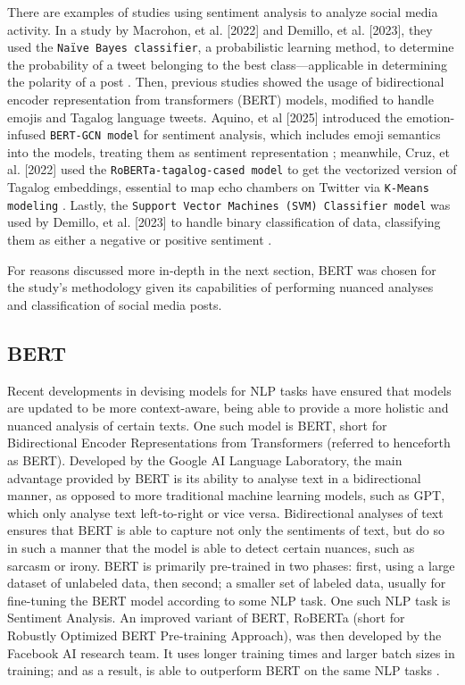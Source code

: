 There are examples of studies using sentiment analysis to analyze social media activity. In a study by Macrohon, et al. [2022] and Demillo, et al. [2023], they used the \texttt{Naïve Bayes classifier}, a probabilistic learning method, to determine the probability of a tweet belonging to the best class—applicable in determining the polarity of a post \cite{RRL_Macrohon-2022,RRL_Demillo-2025}. Then, previous studies showed the usage of bidirectional encoder representation from transformers (BERT) models, modified to handle emojis and Tagalog language tweets. Aquino, et al [2025] introduced the emotion-infused \texttt{BERT-GCN model} for sentiment analysis, which includes emoji semantics into the models, treating them as sentiment representation  \cite{RRL_Aquino-2025}; meanwhile, Cruz, et al. [2022] used the \texttt{RoBERTa-tagalog-cased model} to get the vectorized version of Tagalog embeddings, essential to map echo chambers on Twitter via \texttt{K-Means modeling} \cite{RRL_Cruz-2022}. Lastly, the \texttt{Support Vector Machines (SVM) Classifier model} was used by Demillo, et al. [2023] to handle binary classification of data, classifying them as either a negative or positive sentiment \cite{RRL_Demillo-2025}.

For reasons discussed more in-depth in the next section, BERT was chosen for the study’s methodology given its capabilities of performing nuanced analyses and classification of social media posts.

\subsection{BERT}
Recent developments in devising models for NLP tasks have ensured that models are updated to be more context-aware, being able to provide a more holistic and nuanced analysis of certain texts. One such model is BERT, short for Bidirectional Encoder Representations from Transformers (referred to henceforth as BERT). Developed by the Google AI Language Laboratory, the main advantage provided by BERT is its ability to analyse text in a bidirectional manner, as opposed to more traditional machine learning models, such as GPT, which only analyse text left-to-right or vice versa. Bidirectional analyses of text ensures that BERT is able to capture not only the sentiments of text, but do so in such a manner that the model is able to detect certain nuances, such as sarcasm or irony. BERT is primarily pre-trained in two phases: first, using a large dataset of unlabeled data, then second; a smaller set of labeled data, usually for fine-tuning the BERT model according to some NLP task. One such NLP task is Sentiment Analysis. An improved variant of BERT, RoBERTa (short for Robustly Optimized BERT Pre-training Approach), was then developed by the Facebook AI research team. It uses longer training times and larger batch sizes in training; and as a result, is able to outperform BERT on the same NLP tasks \cite{RRL_Koroteev-2021}. 

